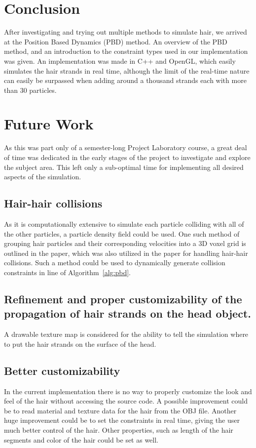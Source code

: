\documentclass[sigplan,screen,nonacm]{acmart}
\begin{document}
\section{Conclusion}
\label{sec:conclusion}
After investigating and trying out multiple methods to simulate hair, we arrived
at the Position Based Dynamics (PBD) method. An overview of the PBD method, and
an introduction to the constraint types used in our implementation was given.
An implementation was made in C++ and OpenGL, which easily simulates the hair
strands in real time, although the limit of the real-time nature can easily be
surpassed when adding around a thousand strands each with more than 30
particles.

\section{Future Work}
\label{sec:future_work}
As this was part only of a semester-long Project Laboratory course, a great deal
of time was dedicated in the early stages of the project to investigate and
explore the subject area. This left only a sub-optimal time for implementing all
desired aspects of the simulation.

\subsection{Hair-hair collisions}
\label{subsec:future_work_collision}
As it is computationally extensive to simulate each particle colliding with all
of the other particles, a particle density field could be used. One such method
of grouping hair particles and their corresponding velocities into a 3D voxel
grid is outlined in the \citet{PixarVolumetricHair} paper, which was also
utilized in the \citet{FTLHair} paper for handling hair-hair collisions.
Such a method could be used to dynamically generate collision constraints in
line  of Algorithm~\ref{alg:pbd}.

\subsection{Refinement and proper customizability of the propagation of hair
strands on the head object.} 
A drawable texture map is considered for the ability to tell the simulation
where to put the hair strands on the surface of the head.

\subsection{Better customizability}
In the current implementation there is no way to properly customize the look and
feel of the hair without accessing the source code. A possible improvement could
be to read material and texture data for the hair from the OBJ file. Another
huge improvement could be to set the constraints in real time, giving the user
much better control of the hair. Other properties, such as length of the hair
segments and color of the hair could be set as well.
\end{document}
